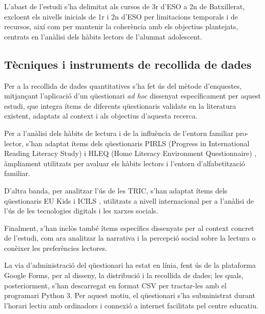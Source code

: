 \documentclass[12pt]{article}
\begin{document}
L’abast de l’estudi s’ha delimitat als cursos de 3r d’ESO a 2n de Batxillerat, excloent els nivells inicials de 1r i 2n d'ESO per limitacions temporals i de recursos, així com per mantenir la coherència amb els objectius plantejats, centrats en l'anàlisi dels hàbits lectors de l'alumnat adolescent.

\subsection{Tècniques i instruments de recollida de dades}

Per a la recollida de dades quantitatives s'ha fet ús del mètode d'enquestes, mitjançant l'aplicació d'un qüestionari \emph{ad hoc} dissenyat específicament per aquest estudi, que integra ítems de diferents qüestionaris validats en la literatura existent, adaptats al context i als objectius d'aquesta recerca.

Per a l’anàlisi dels hàbits de lectura i de la influència de l’entorn familiar pro-lector, s’han adaptat ítems dels qüestionaris PIRLS (Progress in International Reading Literacy Study) \parencite{pirls} i HLEQ (Home Literacy Environment Questionnaire) \parencite{hleq}, àmpliament utilitzats per avaluar els hàbits lectors i l’entorn d’alfabetització familiar.

D'altra banda, per analitzar l'ús de les TRIC, s’han adaptat ítems dels qüestionaris EU Kids \parencite{eukids} i ICILS \parencite{icils}, utilitzats a nivell internacional per a l’anàlisi de l’ús de les tecnologies digitals i les xarxes socials.

Finalment, s’han inclòs també ítems específics dissenyats per al context concret de l’estudi, com ara analitzar la narrativa i la percepció social sobre la lectura o conèixer les preferències lectores.


La via d’administració del qüestionari ha estat en línia, fent ús de la plataforma Google Forms, per al disseny, la distribució i la recollida de dades; les quals, posteriorment, s'han descarregat en format CSV per tractar-les amb el programari Python 3. Per aquest motiu, el qüestionari s'ha subministrat durant l’horari lectiu amb ordinadors i connexió a internet facilitats pel centre educatiu.
\end{document}
